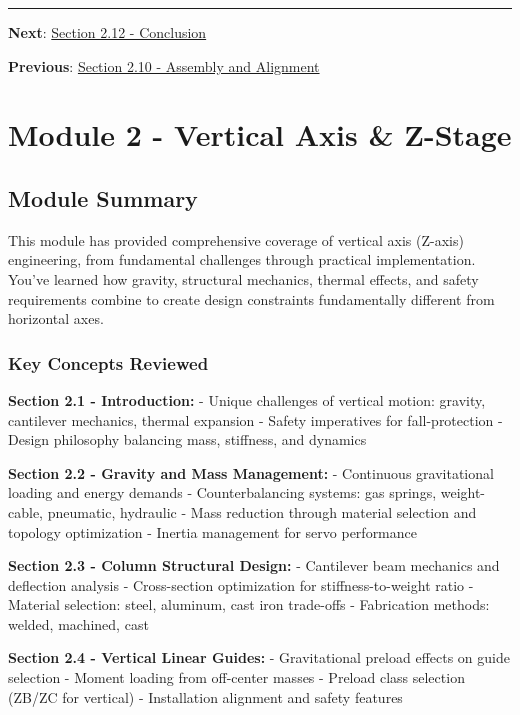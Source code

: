 \documentclass[
]{article}
\begin{document}
\begin{center}\rule{0.5\linewidth}{0.5pt}\end{center}

\textbf{Next}: \href{section-2.12-conclusion.md}{Section 2.12 -
Conclusion}

\textbf{Previous}: \href{section-2.10-assembly-alignment.md}{Section
2.10 - Assembly and Alignment}

\newpage

\section{Module 2 - Vertical Axis \&
Z-Stage}\label{module-2---vertical-axis-z-stage-2}

\subsection{Module Summary}\label{module-summary}

This module has provided comprehensive coverage of vertical axis
(Z-axis) engineering, from fundamental challenges through practical
implementation. You've learned how gravity, structural mechanics,
thermal effects, and safety requirements combine to create design
constraints fundamentally different from horizontal axes.

\subsubsection{Key Concepts Reviewed}\label{key-concepts-reviewed}

\textbf{Section 2.1 - Introduction:} - Unique challenges of vertical
motion: gravity, cantilever mechanics, thermal expansion - Safety
imperatives for fall-protection - Design philosophy balancing mass,
stiffness, and dynamics

\textbf{Section 2.2 - Gravity and Mass Management:} - Continuous
gravitational loading and energy demands - Counterbalancing systems: gas
springs, weight-cable, pneumatic, hydraulic - Mass reduction through
material selection and topology optimization - Inertia management for
servo performance

\textbf{Section 2.3 - Column Structural Design:} - Cantilever beam
mechanics and deflection analysis - Cross-section optimization for
stiffness-to-weight ratio - Material selection: steel, aluminum, cast
iron trade-offs - Fabrication methods: welded, machined, cast

\textbf{Section 2.4 - Vertical Linear Guides:} - Gravitational preload
effects on guide selection - Moment loading from off-center masses -
Preload class selection (ZB/ZC for vertical) - Installation alignment
and safety features
\end{document}
